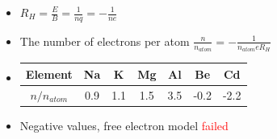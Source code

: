 \documentclass{article}
\theoremstyle{remark}
\theoremstyle{remark}
\begin{document}
\begin{enumerate}
\begin{itemize}
            \item $\boxed{R_H = \frac{E}{B} = \frac{1}{nq}=-\frac{1}{ne}}$
            \item The number of electrons per atom $\frac{n}{n_{atom}}=-\frac{1}{n_{atom}e R_H}$
            \item \begin{tabular}{|c|c|c|c|c|c|c|}\hline
                    Element & Na & K & Mg & Al & Be & Cd\\\hline
                    $n/n_{atom}$ & 0.9 & 1.1 & 1.5 & 3.5 & -0.2 & -2.2\\\hline
                  \end{tabular}
            \item Negative values, free electron model \textcolor{red}{failed}
        \end{itemize}
\end{enumerate}
\end{document}
